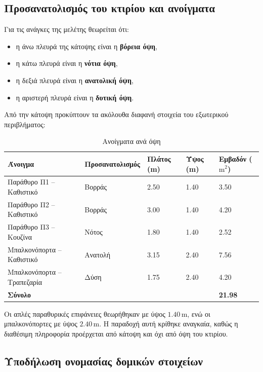 \documentclass[12pt,a4paper]{article}
\begin{document}
\subsection{Προσανατολισμός του κτιρίου και ανοίγματα}

Για τις ανάγκες της μελέτης θεωρείται ότι:

\begin{itemize}
\item η άνω πλευρά της κάτοψης είναι η \textbf{βόρεια όψη},
\item η κάτω πλευρά είναι η \textbf{νότια όψη},
\item η δεξιά πλευρά είναι η \textbf{ανατολική όψη},
\item η αριστερή πλευρά είναι η \textbf{δυτική όψη}.
\end{itemize}

Από την κάτοψη προκύπτουν τα ακόλουθα διαφανή στοιχεία του εξωτερικού περιβλήματος:

\begin{table}[H]
\centering
\small
\caption{Ανοίγματα ανά όψη}
\begin{tabularx}{\textwidth}{L C{2.7cm} C{2.2cm} C{2.2cm} C{2.4cm}}
\toprule
\textbf{Άνοιγμα} & \textbf{Προσανατολισμός} & \textbf{Πλάτος (m)} & \textbf{Ύψος (m)} & \textbf{Εμβαδόν (\(\mathrm{m^2}\))} \\
\midrule
Παράθυρο Π1 -- Καθιστικό & Βορράς & 2.50 & 1.40 & 3.50 \\
Παράθυρο Π2 -- Καθιστικό & Βορράς & 3.00 & 1.40 & 4.20 \\
Παράθυρο Π3 -- Κουζίνα & Νότος & 1.80 & 1.40 & 2.52 \\
Μπαλκονόπορτα -- Καθιστικό & Ανατολή & 3.15 & 2.40 & 7.56 \\
Μπαλκονόπορτα -- Τραπεζαρία & Δύση & 1.75 & 2.40 & 4.20 \\
\midrule
\textbf{Σύνολο} &  &  &  & \textbf{21.98} \\
\bottomrule
\end{tabularx}
\end{table}

Οι απλές παραθυρικές επιφάνειες θεωρήθηκαν με ύψος \(1.40\,\mathrm{m}\), ενώ οι
μπαλκονόπορτες με ύψος \(2.40\,\mathrm{m}\). Η παραδοχή αυτή κρίθηκε αναγκαία, καθώς η
διαθέσιμη πληροφορία προέρχεται από κάτοψη και όχι από όψη του κτιρίου.

\subsection{Υποδήλωση ονομασίας δομικών στοιχείων}
\end{document}
